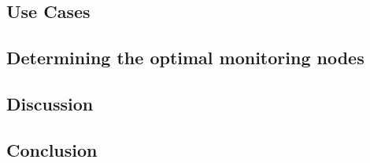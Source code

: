 \newpage
\subsection{Use Cases}


\subsection{Determining the optimal monitoring nodes}


\subsection{Discussion}


\subsection{Conclusion}
